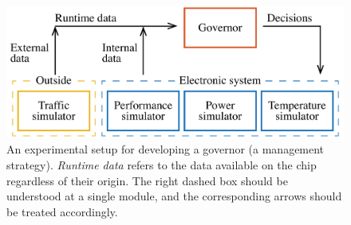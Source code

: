 \begin{figure}
  \centering
  \includegraphics[width=1.0\columnwidth]{include/assets/figures/development.pdf}
  \caption{
    An experimental setup for developing a governor (a management strategy).
    \emph{Runtime data} refers to the data available on the chip regardless of
    their origin. The right dashed box should be understood at a single module,
    and the corresponding arrows should be treated accordingly.
  }
\end{figure}

